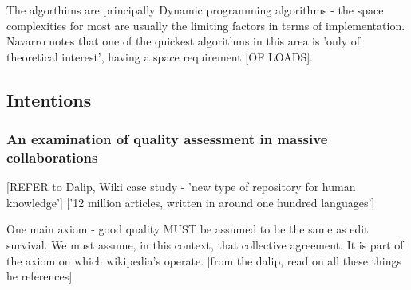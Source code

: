 \documentclass[a4paper,11pt,twoside,notitlepage]{report}
\begin{document}
        The algorthims are principally Dynamic programming algorithms
        - the space complexities for most are usually the limiting
        factors in terms of implementation. Navarro notes that one of
        the quickest algorithms in this area is 'only of theoretical
        interest', having a space requirement [OF LOADS].

        \subsection{Intentions}
        \subsubsection{An examination of quality assessment in massive
          collaborations}
        [REFER to Dalip, Wiki case study - 'new type of repository for
          human knowledge'] ['12 million articles, written in around 
          one hundred languages']

        One main axiom - good quality MUST be assumed to be the same
        as edit survival. We must assume, in this context, that
        collective agreement. It is part of the axiom on which
        wikipedia's operate. [from the dalip, read on all these things
        he references]


{}
	
\end{document}
